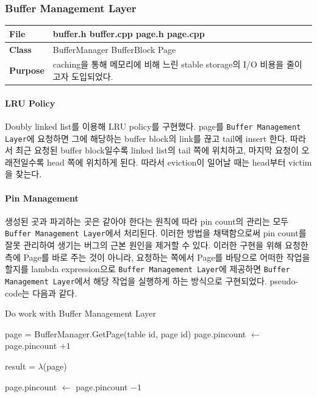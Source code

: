 \documentclass[main.tex]{subfiles}
\begin{document}
\subsubsection{Buffer Management Layer}
\begin{table}[!htb]
	\begin{tabularx}{\textwidth}{|l|X|}
		\hline
		\textbf{File} & buffer.h buffer.cpp page.h page.cpp \\
		\hline
		\textbf{Class} & BufferManager BufferBlock Page \\
		\hline
		\textbf{Purpose} & caching을 통해 메모리에 비해 느린 stable storage의 I/O 비용을 줄이고자 도입되었다. \\
		\hline
	\end{tabularx}
\end{table}

\paragraph{LRU Policy}
Doubly linked list를 이용해 LRU policy를 구현했다. page를 \texttt{Buffer Management Layer}에 요청하면 그에 해당하는 buffer block의 link를 끊고 tail에 insert 한다. 따라서 최근 요청된 buffer block일수록 linked list의 tail 쪽에 위치하고, 마지막 요청이 오래전일수록 head 쪽에 위치하게 된다. 따라서 eviction이 일어날 때는 head부터 victim을 찾는다.

\paragraph{Pin Management}
생성된 곳과 파괴하는 곳은 같아야 한다는 원칙에 따라 pin count의 관리는 모두 \texttt{Buffer Management Layer}에서 처리된다. 이러한 방법을 채택함으로써 pin count를 잘못 관리하여 생기는 버그의 근본 원인을 제거할 수 있다. 이러한 구현을 위해 요청한 측에 Page를 바로 주는 것이 아니라, 요청하는 쪽에서 Page를 바탕으로 어떠한 작업을 할지를 lambda expression으로 \texttt{Buffer Management Layer}에 제공하면 \texttt{Buffer Management Layer}에서 해당 작업을 실행하게 하는 방식으로 구현되었다. pseudo-code는 다음과 같다.

\begin{algorithm}
	\caption{Do work with Buffer Management Layer}
	\begin{algorithmic}
		
			\State page = BufferManager.GetPage(table id, page id)
			\State page.pincount $\gets$ page.pincount $+ 1$
			
			\State result = $\lambda$(page)
			
			\State page.pincount $\gets$ page.pincount $- 1$
			
			\State {}		
		\EndFunction
	\end{algorithmic}
\end{algorithm}
\end{document}
